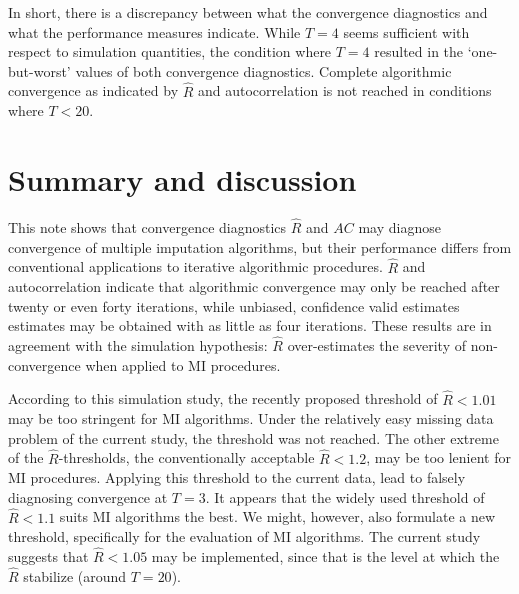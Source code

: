 \documentclass[article]{jss}
\begin{document}
In short, there is a discrepancy between what the convergence diagnostics and what the performance measures indicate. While $T=4$ seems sufficient with respect to simulation quantities, the condition where $T=4$ resulted in the `one-but-worst' values of both convergence diagnostics. Complete algorithmic convergence as indicated by $\widehat{R}$ and autocorrelation is not reached in conditions where $T<20$. %



\section{Summary and discussion} \label{sec:summary}

This note shows that convergence diagnostics $\widehat{R}$ and $AC$ may diagnose convergence of multiple imputation algorithms, but their performance differs from conventional applications to iterative algorithmic procedures. %
$\widehat{R}$ and autocorrelation indicate that algorithmic convergence may only be reached after twenty or even forty iterations, while unbiased, confidence valid estimates estimates may be obtained with as little as four iterations. These results are in agreement with the simulation hypothesis: $\widehat{R}$ over-estimates the severity of non-convergence when applied to MI procedures.




According to this simulation study, the recently proposed threshold of $\widehat{R}<1.01$ may be too stringent for MI algorithms. Under the relatively easy missing data problem of the current study, the threshold was not reached. The other extreme of the $\widehat{R}$-thresholds, the conventionally acceptable $\widehat{R} <1.2$, may be too lenient for MI procedures. Applying this threshold to the current data, lead to falsely diagnosing convergence at $T = 3$. It appears that the widely used threshold of $\widehat{R} < 1.1$ suits MI algorithms the best. We might, however, also formulate a new threshold, specifically for the evaluation of MI algorithms. The current study suggests that $\widehat{R} < 1.05$ may be implemented, since that is the level at which the $\widehat{R}$ stabilize (around $T = 20$). 
\end{document}
